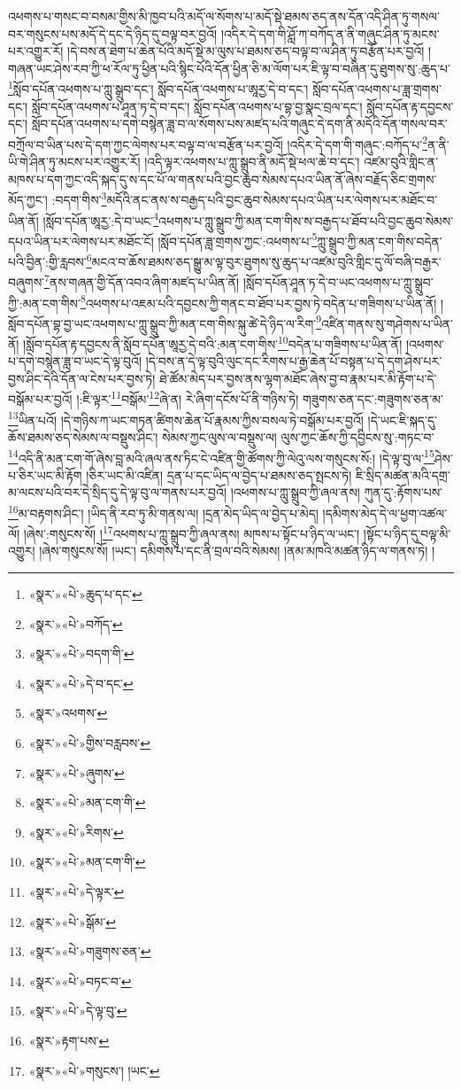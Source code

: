 འཕགས་པ་གསང་བ་བསམ་གྱིས་མི་ཁྱབ་པའི་མདོ་ལ་སོགས་པ་མདོ་སྡེ་ཐམས་ཅད་ནས་དོན་འདི་ཤིན་ཏུ་གསལ་བར་གསུངས་པས་མདོ་དེ་དང་དེ་ཉིད་དུ་བལྟ་བར་བྱའོ། །འདིར་དེ་དག་གི་ཤློ་ཀ་བཀོད་ན་ནི་གཞུང་ཤིན་ཏུ་མངས་པར་འགྱུར་རོ། །དེ་བས་ན་ཐེག་པ་ཆེན་པོའི་མདོ་སྡེ་མ་ལུས་པ་ཐམས་ཅད་བལྟ་བ་ལ་ཤིན་ཏུ་བརྩོན་པར་བྱའོ། །གཞན་ཡང་ཤེས་རབ་ཀྱི་ཕ་རོལ་ཏུ་ཕྱིན་པའི་སྙིང་པོའི་དོན་ཕྱིན་ཅི་མ་ལོག་པར་ཇི་ལྟ་བ་བཞིན་དུ་ཐུགས་སུ་:ཆུད་པ་\footnote{«སྣར་»«པེ་»ཆུད་པ་དང་}སློབ་དཔོན་འཕགས་པ་ཀླུ་སྒྲུབ་དང་། སློབ་དཔོན་འཕགས་པ་ཨཱརྱ་དེ་བ་དང་། སློབ་དཔོན་འཕགས་པ་ཟླ་གྲགས་དང་། སློབ་དཔོན་འཕགས་པ་ཤཱན་ཏ་དེ་བ་དང་། སློབ་དཔོན་འཕགས་པ་བྷ་བྱ་སྣང་བྲལ་དང་། སློབ་དཔོན་རྟ་དབྱངས་དང་། སློབ་དཔོན་འཕགས་པ་དགེ་བསྙེན་ཟླ་བ་ལ་སོགས་པས་མཛད་པའི་གཞུང་དེ་དག་ནི་མདོའི་དོན་གསལ་བར་བཀྲོལ་བ་ཡིན་པས་དེ་དག་ཀྱང་ལེགས་པར་བལྟ་བ་ལ་བརྩོན་པར་བྱའོ། །འདིར་དེ་དག་གི་གཞུང་:བཀོད་པ་\footnote{«སྣར་»«པེ་»བཀོད་}ན་ནི་ཡི་གེ་ཤིན་ཏུ་མངས་པར་འགྱུར་རོ། །འདི་ལྟར་འཕགས་པ་ཀླུ་སྒྲུབ་ནི་མདོ་སྡེ་ཕལ་ཆེ་བ་དང་། འཛམ་བུའི་གླིང་ན་མཁས་པ་དག་ཀྱང་འདི་སྐད་དུ་ས་དང་པོ་ལ་གནས་པའི་བྱང་ཆུབ་སེམས་དཔའ་ཡིན་ནོ་ཞེས་བརྗོད་ཅིང་གྲགས་མོད་ཀྱང་། :བདག་གིས་\footnote{«སྣར་»«པེ་»བདག་གི་}མདོའི་ནང་ནས་ས་བརྒྱད་པའི་བྱང་ཆུབ་སེམས་དཔའ་ཡིན་པར་ལེགས་པར་མཐོང་བ་ཡིན་ནོ། །སློབ་དཔོན་ཨཱརྱ་:དེ་བ་ཡང་\footnote{«སྣར་»«པེ་»དེ་བ་དང་}འཕགས་པ་ཀླུ་སྒྲུབ་ཀྱི་མན་ངག་གིས་ས་བརྒྱད་པ་ཐོབ་པའི་བྱང་ཆུབ་སེམས་དཔའ་ཡིན་པར་ལེགས་པར་མཐོང་ངོ། །སློབ་དཔོན་ཟླ་གྲགས་ཀྱང་:འཕགས་པ་\footnote{«སྣར་»འཕགས་}ཀླུ་སྒྲུབ་ཀྱི་མན་ངག་གིས་བདེན་པའི་བྱིན་:གྱི་རླབས་\footnote{«སྣར་»«པེ་»གྱིས་བརླབས་}མངའ་བ་ཆོས་ཐམས་ཅད་སྒྱུ་མ་ལྟ་བུར་ཐུགས་སུ་ཆུད་པ་འཛམ་བུའི་གླིང་དུ་ལོ་བཞི་བརྒྱར་བཞུགས་\footnote{«སྣར་»«པེ་»ཞུགས་}ནས་གཞན་གྱི་དོན་འབའ་ཞིག་མཛད་པ་ཡིན་ནོ། །སློབ་དཔོན་ཤཱན་ཏ་དེ་བ་ཡང་འཕགས་པ་ཀླུ་སྒྲུབ་ཀྱི་:མན་ངག་གིས་\footnote{«སྣར་»«པེ་»མན་ངག་གི་}འཕགས་པ་འཇམ་པའི་དབྱངས་ཀྱི་གནང་བ་ཐོབ་པར་བྱས་ཏེ་བདེན་པ་གཟིགས་པ་ཡིན་ནོ། །སློབ་དཔོན་བྷ་བྱ་ཡང་འཕགས་པ་ཀླུ་སྒྲུབ་ཀྱི་མན་ངག་གིས་སྐུ་ཚེ་དེ་ཉིད་ལ་རིག་\footnote{«སྣར་»«པེ་»རིགས་}འཛིན་གནས་སུ་གཤེགས་པ་ཡིན་ནོ། །སློབ་དཔོན་རྟ་དབྱངས་ནི་སློབ་དཔོན་ཨཱརྱ་དེ་བའི་:མན་ངག་གིས་\footnote{«སྣར་»«པེ་»མན་ངག་གི་}བདེན་པ་གཟིགས་པ་ཡིན་ནོ། །འཕགས་པ་དགེ་བསྙེན་ཟླ་བ་ཡང་དེ་ལྟ་བུའོ། །དེ་བས་ན་དེ་ལྟ་བུའི་ལུང་དང་རིགས་པ་རྒྱ་ཆེན་པོ་བསྟན་པ་དེ་དག་ཤེས་པར་བྱས་ཤིང་དེའི་དོན་ལ་ངེས་པར་བྱས་ཏེ། ཐེ་ཚོམ་མེད་པར་བྱས་ནས་ལྷག་མཐོང་ཞེས་བྱ་བ་རྣམ་པར་མི་རྟོག་པ་དེ་བསྒོམ་པར་བྱའོ། །:ཇི་ལྟར་\footnote{«སྣར་»«པེ་»དེ་ལྟར་}བསྒོམ་\footnote{«སྣར་»«པེ་»སྒོམ་}ཞེ་ན། རེ་ཞིག་དངོས་པོ་ནི་གཉིས་ཏེ། གཟུགས་ཅན་དང་:གཟུགས་ཅན་མ་\footnote{«སྣར་»«པེ་»གཟུགས་ཅན་}ཡིན་པའོ། །དེ་གཉིས་ཀ་ཡང་གཏན་ཚིགས་ཆེན་པོ་རྣམས་ཀྱིས་བསལ་ཏེ་བསྒོམ་པར་བྱའོ། །དེ་ཡང་ཇི་སྐད་དུ་ཆོས་ཐམས་ཅད་སེམས་ལ་བསྡུས་ཤིང་། སེམས་ཀྱང་ལུས་ལ་བསྡུས་ལ། ལུས་ཀྱང་ཆོས་ཀྱི་དབྱིངས་སུ་:གཏང་བ་\footnote{«སྣར་»«པེ་»བཏང་བ་}འདི་ནི་མན་ངག་གོ་ཞེས་བླ་མའི་ཞལ་ནས་ཏིང་ངེ་འཛིན་གྱི་ཚོགས་ཀྱི་ལེའུ་ལས་གསུངས་སོ:། །དེ་ལྟ་བུ་ལ་\footnote{«སྣར་»«པེ་»དེ་ལྟ་བུ་}ཤེས་པ་ཅིར་ཡང་མི་རྟོག །ཅིར་ཡང་མི་འཛིན། དྲན་པ་དང་ཡིད་ལ་བྱེད་པ་ཐམས་ཅད་སྤངས་ཏེ། ཇི་སྲིད་མཚན་མའི་དགྲ་མ་ལངས་པའི་བར་དེ་སྲིད་དུ་དེ་ལྟ་བུ་ལ་གནས་པར་བྱའོ། །འཕགས་པ་ཀླུ་སྒྲུབ་ཀྱི་ཞལ་ནས། ཀུན་དུ་:རྟོགས་པས་\footnote{«སྣར་»རྟག་པས་}མ་བརྟགས་ཤིང་། །ཡིད་ནི་རབ་ཏུ་མི་གནས་ལ། །དྲན་མེད་ཡིད་ལ་བྱེད་པ་མེད། །དམིགས་མེད་དེ་ལ་ཕྱག་འཚལ་ལོ། །ཞེས་:གསུངས་སོ། །\footnote{«སྣར་»«པེ་»གསུངས་། །ཡང་}འཕགས་པ་ཀླུ་སྒྲུབ་ཀྱི་ཞལ་ནས། མཁས་པ་སྟོང་པ་ཉིད་ལ་ཡང་། །སྟོང་པ་ཉིད་དུ་བལྟ་མི་འགྱུར། །ཞེས་གསུངས་སོ། །ཡང་། དམིགས་པ་དང་ནི་བྲལ་བའི་སེམས། །ནམ་མཁའི་མཚན་ཉིད་ལ་གནས་ཏེ། །
